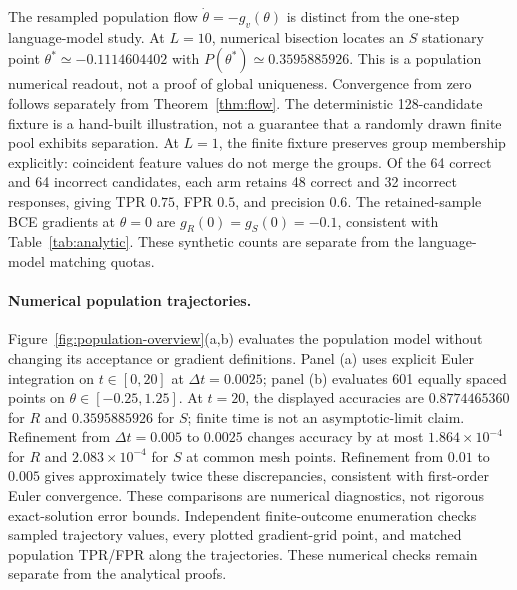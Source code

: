 The resampled population flow $\dot\theta=-g_v(\theta)$ is distinct from the
one-step language-model study. At $L=10$, numerical bisection locates an $S$
stationary point $\theta^*\simeq-0.1114604402$ with
$P(\theta^*)\simeq0.3595885926$. This is a population numerical readout, not
a proof of global uniqueness. Convergence from zero follows separately from
Theorem~\ref{thm:flow}. The deterministic 128-candidate
fixture is a hand-built illustration, not a guarantee that a randomly drawn
finite pool exhibits separation.
At $L=1$, the finite fixture preserves group membership explicitly:
coincident feature values do not
merge the groups. Of the 64 correct and 64 incorrect candidates, each arm
retains 48 correct and 32 incorrect responses, giving TPR $0.75$, FPR $0.5$,
and precision $0.6$. The retained-sample BCE gradients at $\theta=0$ are
$g_R(0)=g_S(0)=-0.1$, consistent with Table~\ref{tab:analytic}.
These synthetic counts are separate from the language-model matching quotas.

\paragraph{Numerical population trajectories.}
Figure~\ref{fig:population-overview}(a,b) evaluates the population model
without changing its acceptance or gradient definitions.
Panel (a) uses explicit Euler integration on
$t\in[0,20]$ at $\Delta t=0.0025$; panel (b) evaluates 601 equally spaced
points on $\theta\in[-0.25,1.25]$. At $t=20$, the displayed accuracies are
$0.8774465360$ for $R$ and $0.3595885926$ for $S$; finite time is not an
asymptotic-limit claim. Refinement from $\Delta t=0.005$ to $0.0025$
changes accuracy by at most $1.864\times10^{-4}$ for $R$ and
$2.083\times10^{-4}$ for $S$ at common mesh points. Refinement from
$0.01$ to $0.005$ gives approximately twice these discrepancies, consistent
with first-order Euler convergence. These comparisons are numerical
diagnostics, not rigorous exact-solution error bounds. Independent
finite-outcome enumeration checks sampled
trajectory values, every plotted gradient-grid point, and matched
population TPR/FPR along the trajectories. These numerical checks remain
separate from the analytical proofs.

